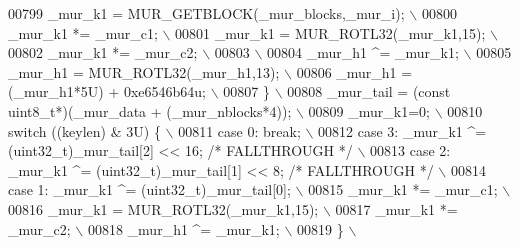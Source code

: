 \begin{DoxyCode}
{{{{{{{{00799 \textcolor{preprocessor}{    \_mur\_k1 = MUR\_GETBLOCK(\_mur\_blocks,\_mur\_i);                        \(\backslash\)}
00800 \textcolor{preprocessor}{    \_mur\_k1 *= \_mur\_c1;                                                \(\backslash\)}
00801 \textcolor{preprocessor}{    \_mur\_k1 = MUR\_ROTL32(\_mur\_k1,15);                                  \(\backslash\)}
00802 \textcolor{preprocessor}{    \_mur\_k1 *= \_mur\_c2;                                                \(\backslash\)}
00803 \textcolor{preprocessor}{                                                                       \(\backslash\)}
00804 \textcolor{preprocessor}{    \_mur\_h1 ^= \_mur\_k1;                                                \(\backslash\)}
00805 \textcolor{preprocessor}{    \_mur\_h1 = MUR\_ROTL32(\_mur\_h1,13);                                  \(\backslash\)}
00806 \textcolor{preprocessor}{    \_mur\_h1 = (\_mur\_h1*5U) + 0xe6546b64u;                              \(\backslash\)}
00807 \textcolor{preprocessor}{  \}                                                                    \(\backslash\)}
00808 \textcolor{preprocessor}{  \_mur\_tail = (const uint8\_t*)(\_mur\_data + (\_mur\_nblocks*4));          \(\backslash\)}
00809 \textcolor{preprocessor}{  \_mur\_k1=0;                                                           \(\backslash\)}
00810 \textcolor{preprocessor}{  switch ((keylen) & 3U) \{                                             \(\backslash\)}
00811 \textcolor{preprocessor}{    case 0: break;                                                     \(\backslash\)}
00812 \textcolor{preprocessor}{    case 3: \_mur\_k1 ^= (uint32\_t)\_mur\_tail[2] << 16; }\textcolor{comment}{/* FALLTHROUGH */}\textcolor{preprocessor}{ \(\backslash\)}
00813 \textcolor{preprocessor}{    case 2: \_mur\_k1 ^= (uint32\_t)\_mur\_tail[1] << 8;  }\textcolor{comment}{/* FALLTHROUGH */}\textcolor{preprocessor}{ \(\backslash\)}
00814 \textcolor{preprocessor}{    case 1: \_mur\_k1 ^= (uint32\_t)\_mur\_tail[0];                         \(\backslash\)}
00815 \textcolor{preprocessor}{    \_mur\_k1 *= \_mur\_c1;                                                \(\backslash\)}
00816 \textcolor{preprocessor}{    \_mur\_k1 = MUR\_ROTL32(\_mur\_k1,15);                                  \(\backslash\)}
00817 \textcolor{preprocessor}{    \_mur\_k1 *= \_mur\_c2;                                                \(\backslash\)}
00818 \textcolor{preprocessor}{    \_mur\_h1 ^= \_mur\_k1;                                                \(\backslash\)}
00819 \textcolor{preprocessor}{  \}                                                                    \(\backslash\)}
}}}}}}}}
\end{DoxyCode}
